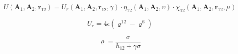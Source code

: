 


$$ U ( \mathbf{A}_1, \mathbf{A}_2, \mathbf{r}_{12} ) = U_r (
\mathbf{A}_1, \mathbf{A}_2, \mathbf{r}_{12}, \gamma ) \cdot \eta_{12} (
\mathbf{A}_1, \mathbf{A}_2, \upsilon ) \cdot \chi_{12} ( \mathbf{A}_1,
\mathbf{A}_2, \mathbf{r}_{12}, \mu ) $$

$$ U_r = 4 \epsilon ( \varrho^{12} - \varrho^6) $$

$$ \varrho = \frac{\sigma}{ h_{12} + \gamma \sigma} $$


